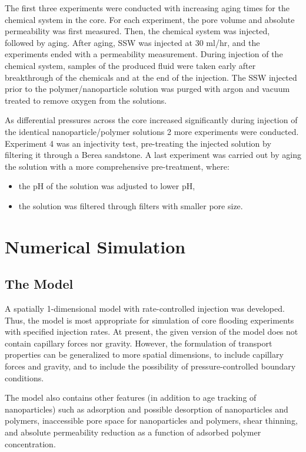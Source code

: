 \documentclass[journal = enfuem, manuscript =  article]{achemso}
\begin{document}
The first three experiments were conducted with increasing aging times for the chemical system in the core. For each experiment, the pore volume and absolute permeability was first measured. Then, the chemical system was injected, followed by aging. After aging, SSW was injected at 30 ml/hr, and the experiments ended with a permeability measurement. During injection of the chemical system, samples of the produced fluid were taken early after breakthrough of the chemicals and at the end of the injection. The SSW injected prior to the polymer/nanoparticle solution was purged with argon and vacuum treated to remove oxygen from the solutions.

As differential pressures across the core increased significantly during injection of the identical nanoparticle/polymer solutions 2 more experiments were conducted. Experiment 4 was an injectivity test, pre-treating the injected solution by filtering it through a Berea sandstone. A last experiment was carried out by aging the solution with a more comprehensive pre-treatment, where:
\begin{itemize}
    \item the pH of the solution was adjusted to lower pH,
    \item the solution was filtered through filters with smaller pore size.
\end{itemize}

\section{Numerical Simulation}
\subsection{The Model}
A spatially 1-dimensional model with rate-controlled injection was developed. Thus, the model is most appropriate for simulation of core flooding experiments with specified injection rates. At present, the given version of the model does not contain capillary forces nor gravity. However, the formulation of transport properties can be generalized to more spatial dimensions, to include capillary forces and gravity, and to include the possibility of pressure-controlled boundary conditions. 

The model also contains other features (in addition to age tracking of nanoparticles) such as adsorption and possible desorption of nanoparticles and polymers, inaccessible pore space for nanoparticles and polymers, shear thinning, and absolute permeability reduction as a function of adsorbed polymer concentration. 
\end{document}

